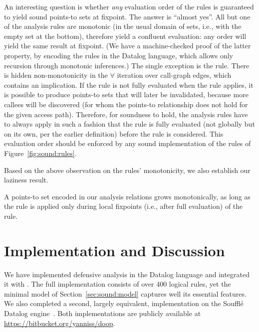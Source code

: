An interesting question is whether \emph{any} evaluation order of the rules is guaranteed to yield sound points-to sets at fixpoint. The answer is ``almost yes''. All but one of the analysis rules are monotonic (in the usual domain of sets, i.e., with the empty set at the bottom), therefore yield a confluent evaluation: any order will yield the same result at fixpoint. (We have a machine-checked proof of the latter property, by encoding the rules in the Datalog language, which allows only recursion through monotonic inferences.) The single exception is the  rule. There is hidden non-monotonicity in the $\forall$ iteration over call-graph edges, which contains an implication. If the  rule is not fully evaluated when the  rule applies, it is possible to produce points-to sets that will later be invalidated, because more callees will be discovered (for whom the points-to relationship does not hold for the given access path). Therefore, for soundness to hold, the analysis rules have to always apply in such a fashion that the  rule is fully evaluated (not globally but on its own, per the earlier definition) before the  rule is considered. This evaluation order should be enforced by any sound implementation of the rules of Figure~\ref{fig:sound:rules}.

Based on the above observation on the rules' monotonicity, we also establish our laziness result.

\begin{theorem}
A points-to set encoded in our analysis relations grows monotonically, as long as the  rule is applied only during local fixpoints (i.e., after full evaluation) of the  rule.
\end{theorem}


\section{Implementation and Discussion}
\label{sec:sound:discussion}

We have implemented defensive analysis in the Datalog language and integrated it with \doop{}. The full implementation consists of over 400 logical rules, yet the minimal model of Section~\ref{sec:sound:model} captures well its essential features. We also completed a second, largely equivalent, implementation on the Souffl\'{e} Datalog engine~\cite{cc:2016:Scholz}. Both implementations are publicly available at \todo{} {\small \url{https://bitbucket.org/yanniss/doop}}.

